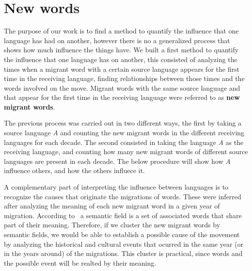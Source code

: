 \documentclass[10pt,letterpaper]{article} %
\begin{document}
\section*{New words} %
The purpose of our work is to find a method to quantify the influence that one
language has had on another, however there is no a generalized process that
shows how much influence the things have. We built a first method to quantify 
the influence that one language has on another, this consisted of analyzing the
times when a migrant word with a certain source language appears for the first
time in the receiving language, finding relationships between those times and
the words involved on the move. Migrant words with the same source language and
that appear for the first time in the receiving language were referred to as
\textbf{new migrant words}. 

The previous process was carried out in two different ways, the first by
taking a source language \textit{A} and counting the new migrant words in the different receiving languages for each decade. The second consisted in taking the language \textit{A} as the receiving language, and counting how many new migrant words of different source languages are present in each decade. The below procedure will show how \textit{A} influence others, and how the others influece it.



A complementary part of interpreting the influence between languages
is to recognize the causes that originate the migrations of words.
These were inferred after analyzing the meaning of each new migrant word in a given year of migration. According to~\cite{semantic_oxford} a semantic field is a set of associated words that share part of their meaning. Therefore, if we cluster the new migrant words  by semantic fields, we would be able to establish a possible cause of the movement by analyzing the historical and cultural events that ocurred  in the same year (or in the years around) of the migrations. This cluster is practical, since words  and the possible event will be realted by their meaning. 
\end{document}
